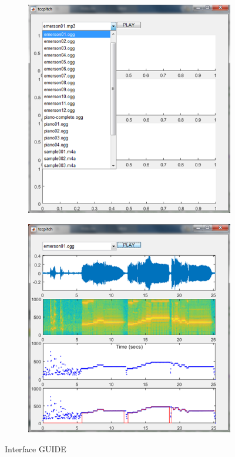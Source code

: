 \begin{figure}[h!]
	\begin{subfigure}{1\textwidth}
			\centering
			\includegraphics[scale=0.6]{pasta1_figuras/guide1.png}
	\end{subfigure}
	\hspace*{\fill} %
	\begin{subfigure}{1\textwidth}
		\centering
		\includegraphics[scale=0.6]{pasta1_figuras/guide2.png}
	\end{subfigure}
	\caption{Interface GUIDE}
	\label{fig-guide-1}
\end{figure}

